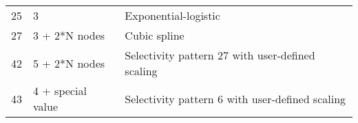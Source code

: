 \begin{center}
\begin{longtable}{p{2cm} p{3cm} p{10cm}}
		25 & 3 & Exponential-logistic \\
		27 & 3 + 2*N nodes & Cubic spline \\
		42 & 5 + 2*N nodes & Selectivity pattern 27 with user-defined scaling \\
		43 & 4 + special value & Selectivity pattern 6 with user-defined scaling \\
		\hline
	\end{longtable}
\end{center}


